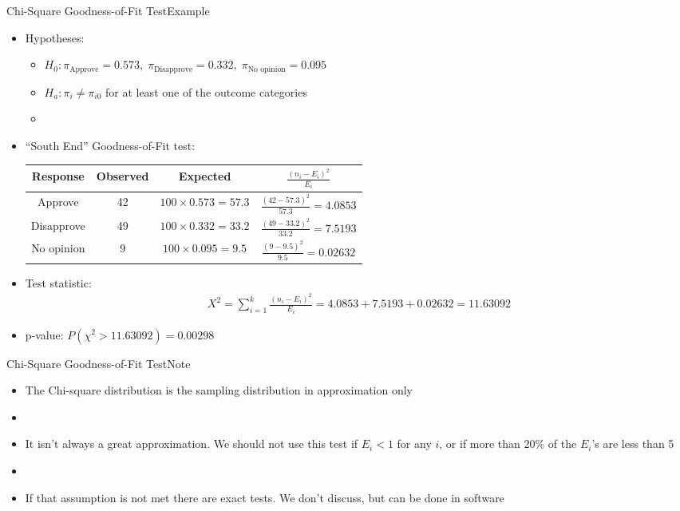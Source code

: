 \documentclass[xcolor=dvipsnames]{beamer}
\begin{document}
\begin{frame}{Chi-Square Goodness-of-Fit Test}{Example}
\begin{itemize}
	\item Hypotheses:
	\begin{itemize}
		\item $H_0: \pi_{\text{Approve}} = 0.573,\; \pi_{\text{Disapprove}} = 0.332,\; \pi_{\text{No opinion}}=0.095$
		\item $H_a: \pi_i \neq \pi_{i0}$ for at least one of the outcome categories
		\item[]
	\end{itemize}
	\item ``South End'' Goodness-of-Fit test:
	{\scriptsize
		\begin{center}
			\begin{tabular}{cccc}
				\hline
				Response & Observed & Expected & $\frac{(n_i-E_i)^2}{E_i}$ \\ \hline \hline
				Approve & 42 & $100 \times 0.573 = 57.3$ & $\frac{(42-57.3)^2}{57.3} = 4.0853$\\
				Disapprove & 49 & $100 \times 0.332 = 33.2$ & $\frac{(49-33.2)^2}{33.2} = 7.5193$\\
				No opinion & 9 & $100 \times 0.095 = 9.5$ & $\frac{(9-9.5)^2}{9.5}=0.02632$\\ \hline
			\end{tabular}
	\end{center}}
	\vspace{1mm}
	\item Test statistic: 
	\begin{gather*}
	X^2 = \sum_{i=1}^k \frac{(n_i-E_i)^2}{E_i} = 4.0853 + 7.5193 + 0.02632 = 11.63092
	\end{gather*}
	\item p-value: $P(\chi^2 > 11.63092) = 0.00298$
\end{itemize}
\end{frame}

\begin{frame}{Chi-Square Goodness-of-Fit Test}{Note}
	\begin{itemize}
		\item The Chi-square distribution is the sampling distribution in approximation only
		\item[]
		\item It isn't always a great approximation. We should not use this test if $E_i <1$ for any $i$, or if more than 20\% of the $E_i$'s are less than 5
		\item[]
		\item If that assumption is not met there are exact tests. We don't discuss, but can be done in software
	\end{itemize}
\end{frame}
\end{document}
